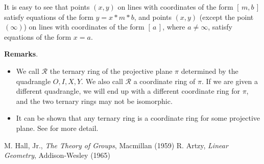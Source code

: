\documentclass[12pt]{article}
\begin{document}
It is easy to see that points $(x,y)$ on lines with coordinates of the form $[\,m,b\,]$ satisfy equations of the form $y=x*m*b$, and points $(x,y)$ (except the point $(\infty)$) on lines with coordinates of the form $[\,a\,]$, where $a\ne \infty$, satisfy equations of the form $x=a$.

\textbf{Remarks}.  
\begin{itemize}
\item We call $\mathcal{R}$ the ternary ring of the projective plane $\pi$ determined by the quadrangle $O,I,X,Y$.  We also call $\mathcal{R}$ a coordinate ring of $\pi$.  If we are given a different quadrangle, we will end up with a different coordinate ring for $\pi$, and the two ternary rings may not be isomorphic.
\item It can be shown that any ternary ring is a coordinate ring for some projective plane.  See  for more detail.
\end{itemize}

\begin{thebibliography}{7}
 M. Hall, Jr., {\it The Theory of Groups}, Macmillan (1959)
 R. Artzy, {\it Linear Geometry}, Addison-Wesley (1965)
\end{thebibliography}
\end{document}
